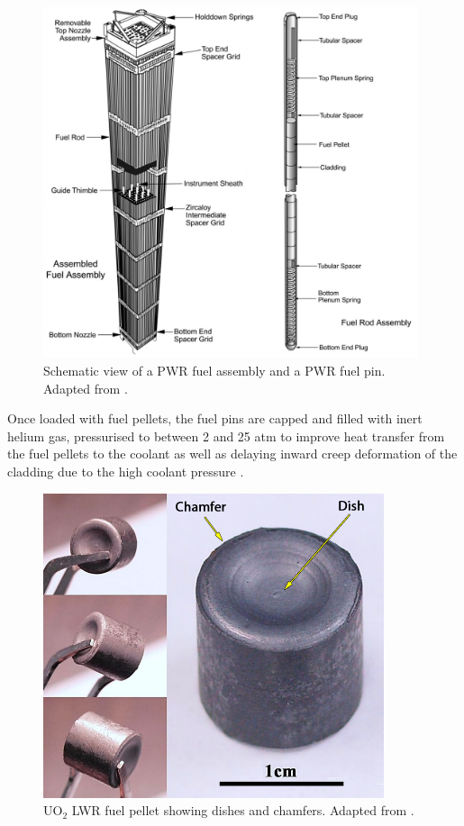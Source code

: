 \begin{figure}[ht]
\centering
\includegraphics[width=11cm]{images/fuelassembly.png}
\caption[Schematic view of a PWR fuel assembly and a PWR fuel pin.]{Schematic view of a PWR fuel assembly and a PWR fuel pin. Adapted from \cite{Croff2003}.}
\label{figure:fuelassembly}
\end{figure} 

Once loaded with fuel pellets, the fuel pins are capped and filled with inert helium gas, pressurised to between 2 and 25 atm to improve heat transfer from the fuel pellets to the coolant as well as delaying inward creep deformation of the cladding due to the high coolant pressure \cite{King1980}. 

\begin{figure}[ht]
\centering
\includegraphics[width=10cm]{images/fuelpellet.png}
\caption[UO$_{2}$ LWR fuel pellet showing dishes and chamfers.]{UO$_{2}$ LWR fuel pellet showing dishes and chamfers. Adapted from \cite{tulenko2013development}.}
\label{figure:fuelpellet}
\end{figure}


